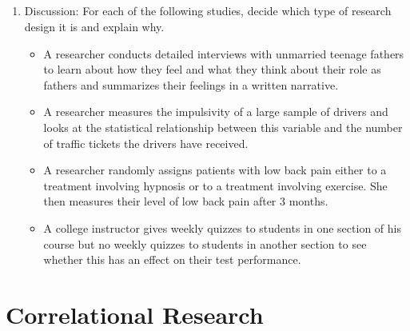 \subsection{}
\begin{fullwidth}
\begin{enumerate}
\item  Discussion: For each of the following studies, decide which type of research design it is and explain why.

\begin{itemize}

\item A researcher conducts detailed interviews with unmarried teenage fathers to learn about how they feel and what they think about their role as fathers and summarizes their feelings in a written narrative.

\item A researcher measures the impulsivity of a large sample of drivers and looks at the statistical relationship between this variable and the number of traffic tickets the drivers have received.

\item A researcher randomly assigns patients with low back pain either to a treatment involving hypnosis or to a treatment involving exercise. She then measures their level of low back pain after 3 months.

\item A college instructor gives weekly quizzes to students in one section of his course but no weekly quizzes to students in another section to see whether this has an effect on their test performance.

\end{itemize}
\end{enumerate}
\end{fullwidth}  

\newpage
\section{Correlational Research}



